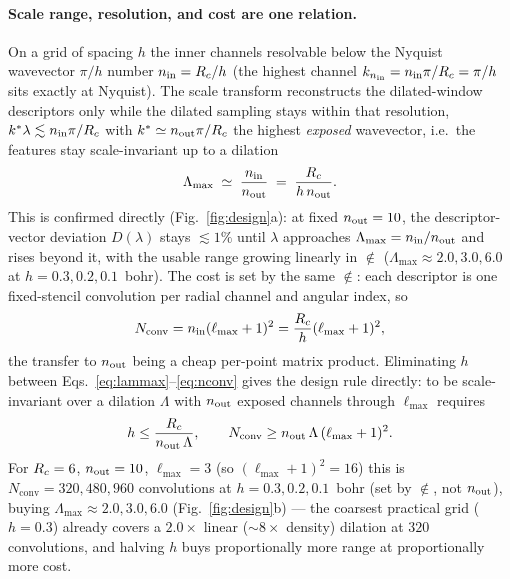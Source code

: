 \paragraph*{Scale range, resolution, and cost are one relation.}
On a grid of spacing $h$ the inner channels resolvable below the Nyquist wavevector
$\pi/h$ number $n_{\mathrm{in}}=R_{c}/h$ (the highest channel $k_{n_{\mathrm{in}}}=n_{\mathrm{in}}\pi/R_{c}=\pi/h$ sits
exactly at Nyquist). The scale transform reconstructs the dilated-window descriptors
only while the dilated sampling stays within that resolution, $k^*\lambda\lesssim
n_{\mathrm{in}}\pi/R_{c}$ with $k^*\simeq n_{\mathrm{out}}\pi/R_{c}$ the highest \emph{exposed} wavevector, i.e.\
the features stay scale-invariant up to a dilation
\begin{equation}
\label{eq:lammax}
\Lambda_{\max}\;\simeq\;\frac{n_{\mathrm{in}}}{n_{\mathrm{out}}}\;=\;\frac{R_{c}}{h\,n_{\mathrm{out}}}.
\end{equation}
This is confirmed directly (Fig.~\ref{fig:design}a): at fixed $n_{\mathrm{out}}=10$, the
descriptor-vector deviation $D(\lambda)$ stays $\lesssim1\%$ until $\lambda$ approaches
$\Lambda_{\max}=n_{\mathrm{in}}/n_{\mathrm{out}}$ and rises beyond it, with the usable range growing linearly
in $\nin$ ($\Lambda_{\max}\approx2.0,3.0,6.0$ at $h=0.3,0.2,0.1$~bohr). The cost is set
by the same $\nin$: each descriptor is one fixed-stencil convolution per radial channel
and angular index, so
\begin{equation}
\label{eq:nconv}
N_{\mathrm{conv}}=n_{\mathrm{in}}(\ell_{\max}+1)^2=\frac{R_{c}}{h}(\ell_{\max}+1)^2 ,
\end{equation}
the transfer to $n_{\mathrm{out}}$ being a cheap per-point matrix product. Eliminating $h$ between
Eqs.~\eqref{eq:lammax}--\eqref{eq:nconv} gives the design rule directly: to be
scale-invariant over a dilation $\Lambda$ with $n_{\mathrm{out}}$ exposed channels through
$\ell_{\max}$ requires
\begin{equation}
\label{eq:designrule}
h\le\frac{R_{c}}{n_{\mathrm{out}}\,\Lambda},\qquad
N_{\mathrm{conv}}\ge n_{\mathrm{out}}\,\Lambda\,(\ell_{\max}+1)^2 .
\end{equation}
For $R_{c}=6$, $n_{\mathrm{out}}=10$, $\ell_{\max}=3$ (so $(\ell_{\max}+1)^2=16$) this is
$N_{\mathrm{conv}}=320,480,960$ convolutions at $h=0.3,0.2,0.1$~bohr (set by $\nin$, not
$n_{\mathrm{out}}$), buying $\Lambda_{\max}\approx2.0,3.0,6.0$ (Fig.~\ref{fig:design}b) --- the
coarsest practical grid ($h=0.3$) already covers a $2.0\times$ linear (${\sim}8\times$
density) dilation at $320$ convolutions, and halving $h$ buys proportionally more range
at proportionally more cost.

